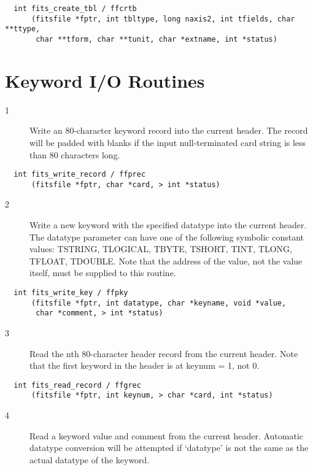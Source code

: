\begin{verbatim}
  int fits_create_tbl / ffcrtb
      (fitsfile *fptr, int tbltype, long naxis2, int tfields, char **ttype,
       char **tform, char **tunit, char *extname, int *status)
\end{verbatim}


\section{Keyword I/O Routines}


\begin{description}
\item[1 ]Write an 80-character keyword record into the current header.  The
   record will be padded with blanks if the input null-terminated
  card string is less than 80 characters long.
\end{description}

\begin{verbatim}
  int fits_write_record / ffprec
      (fitsfile *fptr, char *card, > int *status)
\end{verbatim}

\begin{description}
\item[2 ] Write a new keyword with the specified datatype into the current header.
    The datatype parameter can have one of the following symbolic constant
    values: TSTRING, TLOGICAL, TBYTE, TSHORT, TINT, TLONG, TFLOAT, TDOUBLE.
    Note that the address of the value, not the value itself, must be supplied
   to this routine.
\end{description}

\begin{verbatim}
  int fits_write_key / ffpky
      (fitsfile *fptr, int datatype, char *keyname, void *value,
       char *comment, > int *status)
\end{verbatim}

\begin{description}
\item[3 ] Read the nth 80-character header record from the current header.
   Note that the first keyword in the header is at keynum = 1, not 0.
\end{description}

\begin{verbatim}
  int fits_read_record / ffgrec
      (fitsfile *fptr, int keynum, > char *card, int *status)
\end{verbatim}

\begin{description}
\item[4 ] Read a keyword value and comment from the current header.
    Automatic datatype conversion will be attempted if
   `datatype' is not the same as the actual datatype of the keyword.
\end{description}

